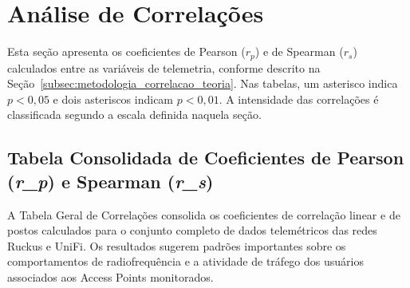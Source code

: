 \section{Análise de Correlações}

Esta seção apresenta os coeficientes de Pearson ($r_p$) e de Spearman ($r_s$) calculados entre as variáveis de telemetria, conforme descrito na Seção~\ref{subsec:metodologia_correlacao_teoria}. Nas tabelas, um asterisco indica $p < 0,05$ e dois asteriscos indicam $p < 0,01$. A intensidade das correlações é classificada segundo a escala definida naquela seção.

\subsection{Tabela Consolidada de Coeficientes de Pearson (\textit{r\_p}) e Spearman (\textit{r\_s})}

A Tabela Geral de Correlações consolida os coeficientes de correlação linear e de postos calculados para o conjunto completo de dados telemétricos das redes Ruckus e UniFi. Os resultados sugerem padrões importantes sobre os comportamentos de radiofrequência e a atividade de tráfego dos usuários associados aos Access Points monitorados.

